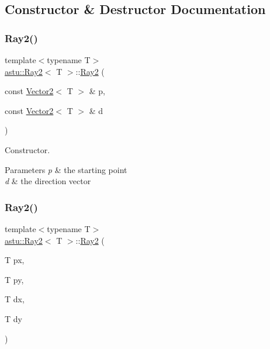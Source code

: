 \subsection{Constructor \& Destructor Documentation}
\mbox{\label{classastu_1_1Ray2_a55a576b162700640ce6781c4585cd677}} 
\subsubsection{\texorpdfstring{Ray2()}{Ray2()}\hspace{0.1cm}{\footnotesize\ttfamily [1/2]}}
{\footnotesize\ttfamily template$<$typename T$>$ \\
\hyperlink{classastu_1_1Ray2}{astu\+::\+Ray2}$<$ T $>$\+::\hyperlink{classastu_1_1Ray2}{Ray2} (\begin{DoxyParamCaption}\item[{const \hyperlink{classastu_1_1Vector2}{Vector2}$<$ T $>$ \&}]{p,  }\item[{const \hyperlink{classastu_1_1Vector2}{Vector2}$<$ T $>$ \&}]{d }\end{DoxyParamCaption})\hspace{0.3cm}{\ttfamily [inline]}}

Constructor.


\begin{DoxyParams}{Parameters}
{\em p} & the starting point \\
\hline
{\em d} & the direction vector \\
\hline
\end{DoxyParams}
\mbox{\label{classastu_1_1Ray2_a01a3a9ea21bf0e02c38c0e4bede6a5c6}} 
\subsubsection{\texorpdfstring{Ray2()}{Ray2()}\hspace{0.1cm}{\footnotesize\ttfamily [2/2]}}
{\footnotesize\ttfamily template$<$typename T$>$ \\
\hyperlink{classastu_1_1Ray2}{astu\+::\+Ray2}$<$ T $>$\+::\hyperlink{classastu_1_1Ray2}{Ray2} (\begin{DoxyParamCaption}\item[{T}]{px,  }\item[{T}]{py,  }\item[{T}]{dx,  }\item[{T}]{dy }\end{DoxyParamCaption})\hspace{0.3cm}{\ttfamily [inline]}}

